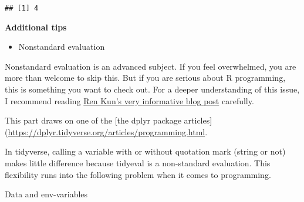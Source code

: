 \documentclass[
]{book}
\newenvironment{Shaded}{\begin{snugshade}}{\end{snugshade}}
\newcommand{\AttributeTok}[1]{\textcolor[rgb]{0.77,0.63,0.00}{#1}}
\newcommand{\CommentTok}[1]{\textcolor[rgb]{0.56,0.35,0.01}{\textit{#1}}}
\newcommand{\DecValTok}[1]{\textcolor[rgb]{0.00,0.00,0.81}{#1}}
\newcommand{\FunctionTok}[1]{\textcolor[rgb]{0.00,0.00,0.00}{#1}}
\newcommand{\NormalTok}[1]{#1}
\newcommand{\OtherTok}[1]{\textcolor[rgb]{0.56,0.35,0.01}{#1}}
\newcommand{\SpecialCharTok}[1]{\textcolor[rgb]{0.00,0.00,0.00}{#1}}
\newcommand{\StringTok}[1]{\textcolor[rgb]{0.31,0.60,0.02}{#1}}
\providecommand{\tightlist}{%
  \setlength{\itemsep}{0pt}\setlength{\parskip}{0pt}}
\begin{document}
\begin{verbatim}
## [1] 4
\end{verbatim}

\textbf{Additional tips}

\begin{itemize}
\tightlist
\item
  Nonstandard evaluation
\end{itemize}

Nonstandard evaluation is an advanced subject. If you feel overwhelmed, you are more than welcome to skip this. But if you are serious about R programming, this is something you want to check out. For a deeper understanding of this issue, I recommend reading \href{https://renkun.me/2014/12/03/tips-on-non-standard-evaluation-in-r/}{Ren Kun's very informative blog post} carefully.

This part draws on one of the {[}the dplyr package articles{]}(\url{https://dplyr.tidyverse.org/articles/programming.html}.

In tidyverse, calling a variable with or without quotation mark (string or not) makes little difference because tidyeval is a non-standard evaluation. This flexibility runs into the following problem when it comes to programming.

\begin{Shaded}
\end{Shaded}

Data and env-variables

\begin{Shaded}
\end{Shaded}
\end{document}
